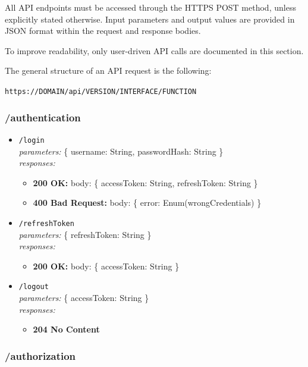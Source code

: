 All API endpoints must be accessed through the HTTPS POST method, unless explicitly stated otherwise. Input parameters and output values are provided in JSON format within the request and response bodies.

To improve readability, only user-driven API calls are documented in this section.

The general structure of an API request is the following:

\texttt{https://DOMAIN/api/VERSION/INTERFACE/FUNCTION}

\subsubsection*{/authentication}

\begin{itemize}
    \item \texttt{/login} \\
    \textit{parameters:} \{ username: String, passwordHash: String \} \\
    \textit{responses:}
    \begin{itemize}
        \item \textbf{200 OK:} body: \{ accessToken: String, refreshToken: String \}
        \item \textbf{400 Bad Request:} body: \{ error: Enum(wrongCredentials) \}
    \end{itemize}

    \item \texttt{/refreshToken} \\
    \textit{parameters:} \{ refreshToken: String \} \\
    \textit{responses:}
    \begin{itemize}
        \item \textbf{200 OK:} body: \{ accessToken: String \}
    \end{itemize}

    \item \texttt{/logout} \\
    \textit{parameters:} \{ accessToken: String \} \\
    \textit{responses:}
    \begin{itemize}
        \item \textbf{204 No Content}
    \end{itemize}
\end{itemize}

\subsubsection*{/authorization}

